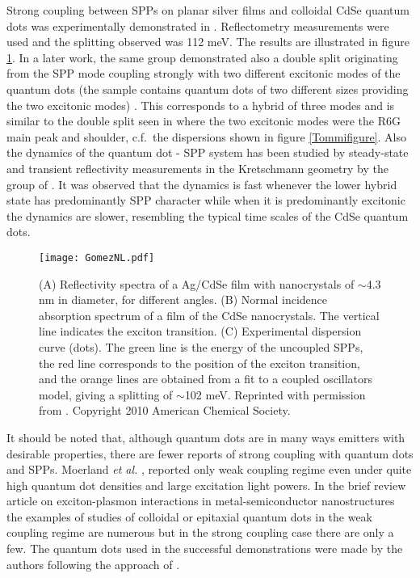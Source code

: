 \documentclass[12pt]{iopart}
\begin{document}
Strong coupling between SPPs on planar silver films and colloidal CdSe quantum dots was experimentally demonstrated in \cite{Gomez2010a}. Reflectometry measurements were used and the splitting observed was 112 meV. The results are illustrated in figure \ref{Gomezfigure}. In a later work, the same group demonstrated also a double split originating from the SPP mode coupling strongly with two different excitonic modes of the quantum dots (the sample contains quantum dots of two different sizes providing the two excitonic modes) \cite{Gomez2010b}. This corresponds to a hybrid of three modes and is similar to the double split seen in \cite{Hakala2009} where the two excitonic modes were the R6G main peak and shoulder, c.f.\ the dispersions shown in figure \ref{Tommifigure}. Also the dynamics of the quantum dot - SPP system has been studied by steady-state and transient reflectivity measurements in the Kretschmann geometry \cite{Gomez2013} by the group of \cite{Gomez2010a,Gomez2010b}. It was observed that the dynamics is fast whenever the lower hybrid state has predominantly SPP character while when it is predominantly excitonic the dynamics are slower, resembling the typical time scales of 
the CdSe quantum dots. 

\begin{figure}
\texttt{[image: GomezNL.pdf]}
\caption{(A) Reflectivity spectra of a Ag/CdSe film with
nanocrystals of $\sim$4.3 nm in diameter, for different angles. (B) Normal incidence absorption spectrum of a film of the
CdSe nanocrystals. The vertical line indicates the exciton
transition. (C) Experimental dispersion curve (dots). The green line is
the energy of the uncoupled SPPs, the red line corresponds to the
position of the exciton transition, and the orange lines
are obtained from a fit to a coupled oscillators model, giving a splitting of $\sim$102 meV. Reprinted with permission 
from \cite{Gomez2010a}. Copyright 2010 American Chemical Society.} 
\label{Gomezfigure}
\end{figure}

It should be noted that, although quantum dots are in many ways emitters with desirable properties, there are fewer reports of strong coupling with quantum dots and SPPs. Moerland {\it et al.} \cite{Moerland2012}, reported only weak coupling regime even under quite high quantum dot densities and large excitation light powers. In the brief review article \cite{Achermann2010} on exciton-plasmon interactions in metal-semiconductor nanostructures the examples of studies of colloidal or epitaxial quantum dots in the weak coupling regime are numerous but in the strong coupling case there are only a few. The quantum dots used in the successful demonstrations \cite{Gomez2010a,Gomez2010b,Gomez2013}
were made by the authors following the approach of \cite{Embden2005}. 
\end{document}
